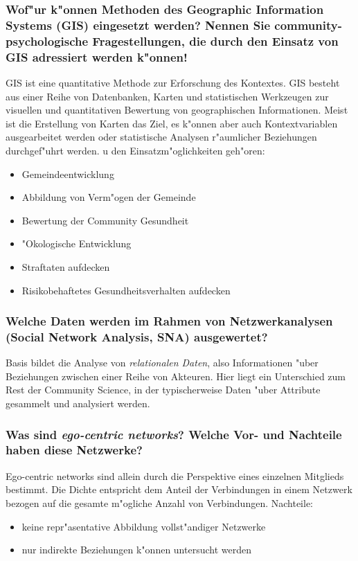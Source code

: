\subsubsection{Wof"ur k"onnen Methoden des Geographic Information Systems (GIS) eingesetzt werden? Nennen Sie community-psychologische Fragestellungen, die durch den Einsatz von GIS adressiert werden k"onnen!}
GIS ist eine quantitative Methode zur Erforschung des Kontextes.  GIS besteht aus einer Reihe von Datenbanken, Karten und statistischen Werkzeugen zur visuellen und quantitativen Bewertung von geographischen Informationen. Meist ist die Erstellung von Karten das Ziel, es k"onnen aber auch Kontextvariablen ausgearbeitet werden oder statistische Analysen r"aumlicher Beziehungen durchgef"uhrt werden. u den Einsatzm"oglichkeiten geh"oren:
\begin{itemize}
  \item Gemeindeentwicklung
  \item Abbildung von Verm"ogen der Gemeinde
  \item Bewertung der Community Gesundheit
  \item "Okologische Entwicklung
  \item Straftaten aufdecken
  \item Risikobehaftetes Gesundheitsverhalten aufdecken
\end{itemize}

\subsubsection{Welche Daten werden im Rahmen von Netzwerkanalysen (Social Network Analysis, SNA) ausgewertet?}
Basis bildet die Analyse von \emph{relationalen Daten}, also Informationen "uber Beziehungen zwischen einer Reihe von Akteuren. Hier liegt ein Unterschied zum Rest der Community Science, in der typischerweise Daten "uber Attribute gesammelt und analysiert werden.

\subsubsection{Was sind \emph{ego-centric networks}? Welche Vor- und Nachteile haben diese Netzwerke?}
Ego-centric networks sind allein durch die Perspektive eines einzelnen Mitglieds bestimmt. Die Dichte entspricht dem Anteil der Verbindungen in einem Netzwerk bezogen auf die gesamte m"ogliche Anzahl von Verbindungen.
Nachteile:\\
\begin{itemize}
  \item keine repr"asentative Abbildung vollst"andiger Netzwerke
  \item nur indirekte Beziehungen k"onnen untersucht werden
\end{itemize}

